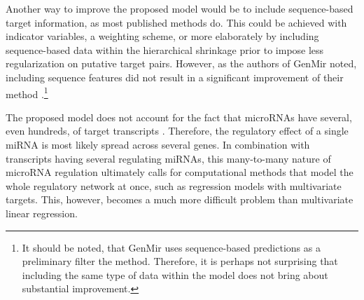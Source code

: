 Another way to improve the proposed model would be to include sequence-based
target information, as most published methods do. This could be achieved with
indicator variables, a weighting scheme, or more elaborately by including
sequence-based data within the hierarchical shrinkage prior to impose less
regularization on putative target pairs. However, as the authors of GenMir
noted, including sequence features did not result in a significant improvement
of their method \citep{Huang2008}.\footnote{It should be noted, that GenMir
uses sequence-based predictions as a preliminary filter the method. Therefore,
it is perhaps not surprising that including the same type of data within the
model does not bring about substantial improvement.}



The proposed model does not account for the fact that microRNAs have
several, even hundreds, of target transcripts \citep{Friedman2009}. Therefore, the
regulatory effect of a single miRNA is most likely spread across several
genes. In combination with transcripts having several regulating miRNAs, this
many-to-many nature of microRNA regulation ultimately calls for computational
methods that model the whole regulatory network at once, such as regression
models with multivariate targets. This, however, becomes a much more difficult
problem than multivariate linear regression.

